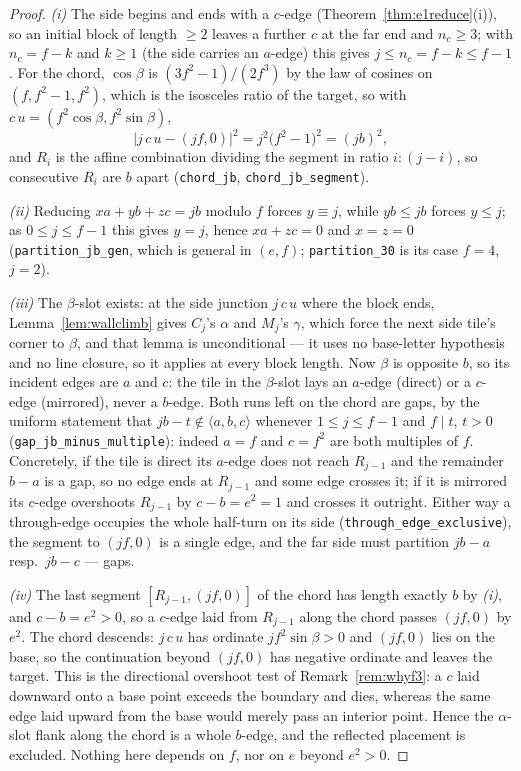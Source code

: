 \documentclass[11pt,reqno]{amsart}
\theoremstyle{plain}
\theoremstyle{definition}
\begin{document}
\begin{proof}
\emph{(i)} The side begins and ends with a $c$-edge (Theorem~\ref{thm:e1reduce}(i)), so an initial
block of length $\ge2$ leaves a further $c$ at the far end and $n_c\ge3$; with $n_c=f-k$ and $k\ge1$
(the side carries an $a$-edge) this gives $j\le n_c=f-k\le f-1$. For the chord, $\cos\beta$ is
$(3f^2-1)/(2f^3)$ by the law of cosines on $(f,f^2-1,f^2)$, which is the isosceles ratio of the
target, so with $c\,u=(f^2\cos\beta,f^2\sin\beta)$,
\[
|j\,c\,u-(jf,0)|^2=j^2\bigl(f^2-1\bigr)^2=(jb)^2 ,
\]
and $R_i$ is the affine combination dividing the segment in ratio $i:(j-i)$, so consecutive $R_i$
are $b$ apart (\texttt{chord\_jb}, \texttt{chord\_jb\_segment}).

\emph{(ii)} Reducing $x a+y b+z c=jb$ modulo $f$ forces $y\equiv j$, while $yb\le jb$ forces $y\le j$;
as $0\le j\le f-1$ this gives $y=j$, hence $xa+zc=0$ and $x=z=0$ (\texttt{partition\_jb\_gen}, which
is general in $(e,f)$; \texttt{partition\_30} is its case $f=4$, $j=2$).

\emph{(iii)} The $\beta$-slot exists: at the side junction $j\,c\,u$ where the block ends,
Lemma~\ref{lem:wallclimb} gives $C_j$'s $\alpha$ and $M_j$'s $\gamma$, which force the next side
tile's corner to $\beta$, and that lemma is unconditional --- it uses no base-letter hypothesis and
no line closure, so it applies at every block length. Now $\beta$ is opposite $b$, so its incident
edges are $a$ and $c$: the tile in the $\beta$-slot lays an $a$-edge (direct) or a $c$-edge
(mirrored), never a $b$-edge. Both runs left on
the chord are gaps, by the uniform statement that $jb-t\notin\langle a,b,c\rangle$ whenever
$1\le j\le f-1$ and $f\mid t$, $t>0$ (\texttt{gap\_jb\_minus\_multiple}): indeed $a=f$ and $c=f^2$
are both multiples of $f$. Concretely, if the tile is direct its $a$-edge does not reach $R_{j-1}$
and the remainder $b-a$ is a gap, so no edge ends at $R_{j-1}$ and some edge crosses it; if it is
mirrored its $c$-edge overshoots $R_{j-1}$ by $c-b=e^2=1$ and crosses it outright. Either way a
through-edge occupies the whole half-turn on its side
(\texttt{through\_edge\_exclusive}), the segment to $(jf,0)$ is a single edge, and the far side must
partition $jb-a$ resp.\ $jb-c$ --- gaps.

\emph{(iv)} The last segment $[R_{j-1},(jf,0)]$ of the chord has length exactly $b$ by \emph{(i)},
and $c-b=e^2>0$, so a $c$-edge laid from $R_{j-1}$ along the chord passes $(jf,0)$ by $e^2$. The
chord descends: $j\,c\,u$ has ordinate $jf^2\sin\beta>0$ and $(jf,0)$ lies on the base, so the
continuation beyond $(jf,0)$ has negative ordinate and leaves the target. This is the directional
overshoot test of Remark~\ref{rem:whyf3}: a $c$ laid downward onto a base point exceeds the
boundary and dies, whereas the same edge laid upward from the base would merely pass an interior
point. Hence the $\alpha$-slot flank along the chord is a whole $b$-edge, and the reflected placement
is excluded. Nothing here depends on $f$, nor on $e$ beyond $e^2>0$.
\end{proof}
\end{document}
